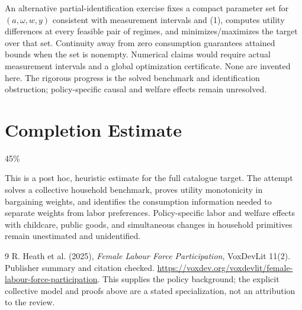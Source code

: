 \documentclass[11pt]{article}
\theoremstyle{definition}
\begin{document}
An alternative partial-identification exercise fixes a compact parameter set
for $(a,\omega,w,y)$ consistent with measurement intervals and (1), computes
utility differences at every feasible pair of regimes, and minimizes/maximizes
the target over that set. Continuity away from zero consumption guarantees
attained bounds when the set is nonempty. Numerical claims would require actual
measurement intervals and a global optimization certificate. None are invented
here. The rigorous progress is the solved benchmark and identification obstruction;
policy-specific causal and welfare effects remain unresolved.

\section{Completion Estimate}
45\%

This is a post hoc, heuristic estimate for the full catalogue target.
The attempt solves a collective household benchmark, proves utility monotonicity in bargaining weights, and identifies the consumption information needed to separate weights from labor preferences. Policy-specific labor and welfare effects with childcare, public goods, and simultaneous changes in household primitives remain unestimated and unidentified.

\begin{thebibliography}{9}
 R. Heath et al. (2025), \emph{Female Labour Force Participation},
VoxDevLit 11(2). Publisher summary and citation checked.
\url{https://voxdev.org/voxdevlit/female-labour-force-participation}.
This supplies the policy background; the explicit collective model and proofs
above are a stated specialization, not an attribution to the review.
\end{thebibliography}
\end{document}
